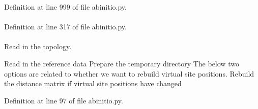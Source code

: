 \-Definition at line 999 of file abinitio.\-py.

\hypertarget{classforcebalance_1_1abinitio_1_1AbInitio_a15710ca46f6141a6e5b00a382aa56632}{
\paragraph[{nesp}]{}}\label{classforcebalance_1_1abinitio_1_1AbInitio_a15710ca46f6141a6e5b00a382aa56632}


\-Definition at line 317 of file abinitio.\-py.

\hypertarget{classforcebalance_1_1abinitio_1_1AbInitio_abab8d9c8cbf4eddc5a3c10b6240423e6}{
\paragraph[{new\-\_\-vsites}]{}}\label{classforcebalance_1_1abinitio_1_1AbInitio_abab8d9c8cbf4eddc5a3c10b6240423e6}


\-Read in the topology. 

\-Read in the reference data \-Prepare the temporary directory \-The below two options are related to whether we want to rebuild virtual site positions. \-Rebuild the distance matrix if virtual site positions have changed 

\-Definition at line 97 of file abinitio.\-py.

\hypertarget{classforcebalance_1_1abinitio_1_1AbInitio_a6f22f2576168b879342fb60913ffc134}{
\paragraph[{nf\-\_\-err}]{}}\label{classforcebalance_1_1abinitio_1_1AbInitio_a6f22f2576168b879342fb60913ffc134}


